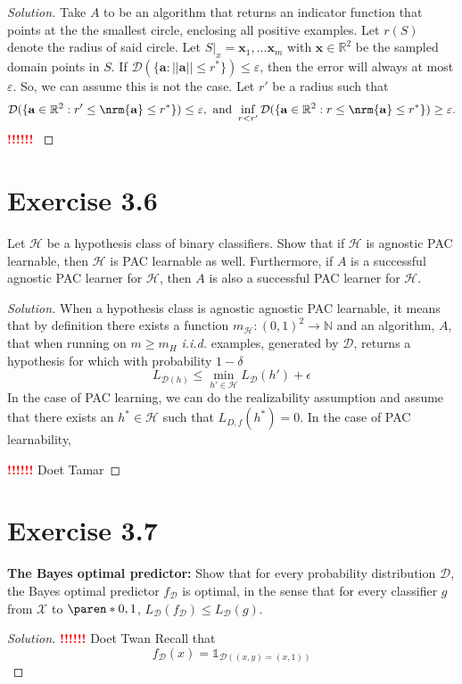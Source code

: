 \documentclass[10pt, a4paper, twoside]{amsart}
\newcommand{\N}{\ensuremath{\mathbb{N}}}
\newcommand{\R}{\ensuremath{\mathbb{R}}}
\DeclarePairedDelimiter\paren()
\DeclarePairedDelimiter{\nrm}\lVert\rVert
\newcommand{\Ind}{\ensuremath{\mathbb{1}}}
\newenvironment{solution}
               {\let\oldqedsymbol=\qedsymbol
                \renewcommand{\qedsymbol}{$\blacktriangleleft$}
                \begin{proof}[Solution]}
               {\end{proof}
                \renewcommand{\qedsymbol}{\oldqedsymbol}}
\newcommand{\TODO}{\textcolor{red}{\textbf{!!!!!! }}}
\begin{document}
\begin{solution}
  Take $A$ to be an algorithm that returns an indicator function that points at the the smallest circle, enclosing all positive examples. Let $r(S)$ denote the radius of said circle.
  Let $S|_x  = \mathbf{x}_1,\ldots \mathbf{x}_m$ with $\mathbf{x} \in \R^2$ be the sampled domain points in $S$. 
  If $\mathcal{D}(\{\mathbf{a}:||\mathbf{a}||\leq r^{*}\}) \leq \varepsilon $, 
  then the error will always at most $\varepsilon$.
  So, we can assume this is not the case.
  Let $r'$ be a radius such that
  \begin{equation*}
    \mathcal{D}(\{\mathbf{a} \in \R^2 : r' \leq \nrm{\mathbf{a}} \leq r^*\}) \leq \varepsilon, \text{ and }
    \inf_{r<r'}\mathcal{D}(\{\mathbf{a} \in \R^2 : r \leq \nrm{\mathbf{a}} \leq r^*\}) \geq \varepsilon.
  \end{equation*}
  \TODO
  
\end{solution}


\section*{Exercise 3.6}
Let $\mathcal{H}$ be a hypothesis class of binary classifiers. Show that if $\mathcal{H}$ is agnostic PAC learnable, then $\mathcal{H}$ is PAC learnable as well.
Furthermore, if $A$ is a successful agnostic PAC learner for $\mathcal{H}$, then $A$ is also a successful PAC learner for $\mathcal{H}$.
\begin{solution}
  When a hypothesis class is agnostic agnostic  PAC learnable, it means that by definition there exists a function $m_{\mathcal{H}}:(0,1)^2\to \N$ and an algorithm, $A$, that when running on $m\geq m_{H}$ \textit{i.i.d.} examples, generated by $\mathcal{D}$, returns a hypothesis for which
  with probability $1-\delta$
  \begin{equation*}
    L_{\mathcal{D}(h)} \leq \min_{h' \in \mathcal{H}}L_{\mathcal{D}}(h')+\epsilon
  \end{equation*}
In the case of PAC learning, we can do the realizability assumption and assume that there exists an $h^* \in \mathcal{H}$ such that $L_{D,f}(h^*) = 0$. In the case of PAC learnability, 
  
    
  \TODO Doet Tamar
\end{solution}


\section*{Exercise 3.7}
\textbf{The Bayes optimal predictor:} Show that for every probability distribution $\mathcal{D}$, the Bayes optimal predictor $f_{\mathcal{D}}$ is optimal, in the sense that for every classifier $g$ from $\mathcal{X}$ to $\paren*{0,1}$, $L_{\mathcal{D}}(f_{\mathcal{D}}) \leq L_{\mathcal{D}}(g)$.
\begin{solution}
\TODO Doet Twan
 Recall that 
 \begin{equation*}
  f_{\mathcal{D}}(x)=\Ind_{\mathcal{D}((x,y)=(x,1))}
 \end{equation*}

 
\end{solution}
\end{document}
